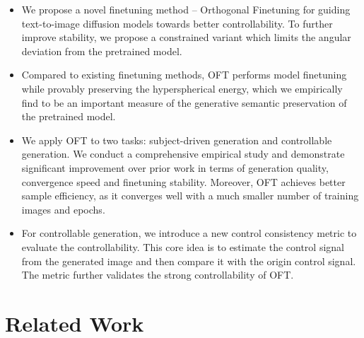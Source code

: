 \documentclass{article}
\begin{document}
\vspace{0.25mm}
\begin{itemize}[leftmargin=*,nosep]
\setlength\itemsep{0.4em}
    \item We propose a novel finetuning method -- Orthogonal Finetuning for guiding text-to-image diffusion models towards better controllability. To further improve stability, we propose a constrained variant which limits the angular deviation from the pretrained model.
    \item Compared to existing finetuning methods, OFT performs model finetuning while provably preserving the hyperspherical energy, which we empirically find to be an important measure of the generative semantic preservation of the pretrained model.
    \item We apply OFT to two tasks: subject-driven generation and controllable generation. We conduct a comprehensive empirical study and demonstrate significant improvement over prior work in terms of generation quality, convergence speed and finetuning stability. Moreover, OFT achieves better sample efficiency, as it converges well with a much smaller number of training images and epochs.
    \item For controllable generation, we introduce a new control consistency metric to evaluate the controllability. This core idea is to estimate the control signal from the generated image and then compare it with the origin control signal. The metric further validates the strong controllability of OFT.
\end{itemize}
\vspace{0.5mm}




\vspace{-2mm}
\section{Related Work}
\vspace{-1.46mm}
\end{document}
